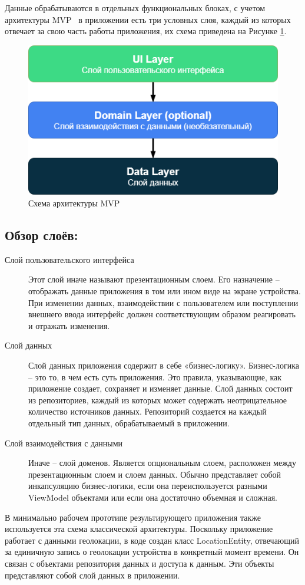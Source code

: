 Данные обрабатываются в отдельных функциональных блоках, с учетом архитектуры MVP~\autocite{mvp} \textemdash\space в приложении есть три условных слоя, каждый из которых отвечает за свою часть работы приложения, их схема приведена на Рисунке \ref{fig:arch_uil_dol_dal}.

\begin{figure}[H]
	\centering
	\includegraphics[width=\textwidth]{flesh/arch/uil-dol-dal.png}
	\caption{\label{fig:arch_uil_dol_dal}Схема архитектуры MVP}
\end{figure}

\subsection*{Обзор слоёв:}
\begin{description}
	\item[Слой пользовательского интерфейса] Этот слой иначе называют презентационным слоем. Его назначение – отображать данные приложения в том или ином виде на экране устройства. При изменении данных, взаимодействии с пользователем или поступлении внешнего ввода интерфейс должен соответствующим образом реагировать и отражать изменения.
	\item[Слой данных] Слой данных приложения содержит в себе «бизнес-логику». Бизнес-логика – это то, в чем есть суть приложения. Это правила, указывающие, как приложение создает, сохраняет и изменяет данные.
	Слой данных состоит из репозиториев, каждый из которых может содержать неотрицательное количество источников данных. Репозиторий создается на каждый отдельный тип данных, обрабатываемый в приложении.
	\item[Слой взаимодействия с данными] Иначе – слой доменов. Является опциональным слоем, расположен между презентационным слоем и слоем данных.
	Обычно представляет собой инкапсуляцию бизнес-логики, если она переиспользуется разными ViewModel объектами или если она достаточно объемная и сложная.
\end{description}
\smallskip
В минимально рабочем прототипе результирующего приложения также используется эта схема классической архитектуры.
Поскольку приложение работает с данными геолокации, в коде создан класс LocationEntity, отвечающий за единичную запись о геолокации устройства в конкретный момент времени. 
Он связан с объектами репозитория данных и доступа к данным. 
Эти объекты представляют собой слой данных в приложении.


